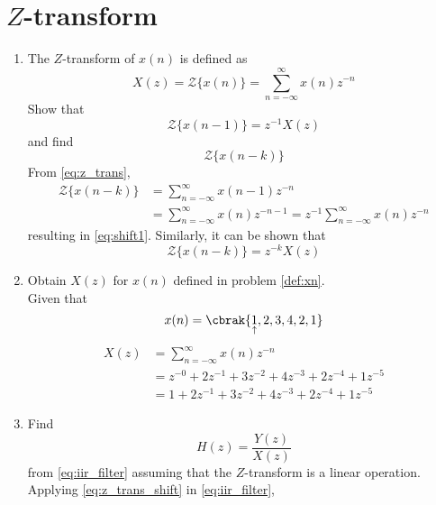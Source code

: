 \documentclass[journal,12pt,twocolumn]{IEEEtran}
\renewcommand\thesection{\arabic{section}}
\begin{document}
\section{$Z$-transform}
\begin{enumerate}[label=\thesection.\arabic*]
\item The $Z$-transform of $x(n)$ is defined as
%
\begin{equation}
\label{eq:z_trans}
X(z)={\mathcal {Z}}\{x(n)\}=\sum _{n=-\infty }^{\infty }x(n)z^{-n}
\end{equation}
%
Show that
\begin{equation}
\label{eq:shift1}
{\mathcal {Z}}\{x(n-1)\} = z^{-1}X(z)
\end{equation}
and find
\begin{equation}
	{\mathcal {Z}}\{x(n-k)\} 
\end{equation}
\solution From \eqref{eq:z_trans},
\begin{align}
{\mathcal {Z}}\{x(n-k)\} &=\sum _{n=-\infty }^{\infty }x(n-1)z^{-n}
\\
&=\sum _{n=-\infty }^{\infty }x(n)z^{-n-1} = z^{-1}\sum _{n=-\infty }^{\infty }x(n)z^{-n}
\end{align}
resulting in \eqref{eq:shift1}. Similarly, it can be shown that
%
\begin{equation}
\label{eq:z_trans_shift}
	{\mathcal {Z}}\{x(n-k)\} = z^{-k}X(z)
\end{equation}
\item Obtain $X(z)$ for $x(n)$ defined in problem 
	\ref{def:xn}.
\solution
\\Given that\\
\begin{equation}
	x(n) = \cbrak{\underset{\uparrow}{1},2,3,4,2,1}
\end{equation}
\begin{align}
	X(z) &= \sum _{n= -\infty}^{\infty}x(n)z^{-n}
	\\&=z^{-0}+2z^{-1}+3z^{-2}+4z^{-3}+2z^{-4}+1z^{-5}
	\\&= 1+2z^{-1}+3z^{-2}+4z^{-3}+2z^{-4}+1z^{-5}
\end{align}
\item Find
%
\begin{equation}
H(z) = \frac{Y(z)}{X(z)}
\end{equation}
%
from  \eqref{eq:iir_filter} assuming that the $Z$-transform is a linear operation.
\\
\solution  Applying \eqref{eq:z_trans_shift} in \eqref{eq:iir_filter},
\begin{align}

\end{align}
\end{enumerate}
\end{document}
